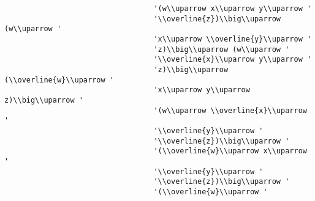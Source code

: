 \begin{verbatim}
                                  '(w\\uparrow x\\uparrow y\\uparrow '
                                  '\\overline{z})\\big\\uparrow (w\\uparrow '
                                  'x\\uparrow \\overline{y}\\uparrow '
                                  'z)\\big\\uparrow (w\\uparrow '
                                  '\\overline{x}\\uparrow y\\uparrow '
                                  'z)\\big\\uparrow (\\overline{w}\\uparrow '
                                  'x\\uparrow y\\uparrow z)\\big\\uparrow '
                                  '(w\\uparrow \\overline{x}\\uparrow '
                                  '\\overline{y}\\uparrow '
                                  '\\overline{z})\\big\\uparrow '
                                  '(\\overline{w}\\uparrow x\\uparrow '
                                  '\\overline{y}\\uparrow '
                                  '\\overline{z})\\big\\uparrow '
                                  '(\\overline{w}\\uparrow '

\end{verbatim}

